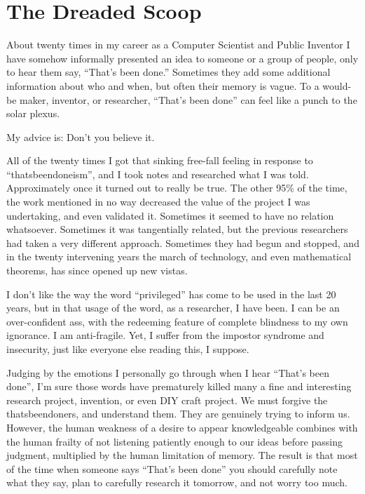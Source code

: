 \documentclass[
	fontsize=10pt, %
	twoside=false, %
	secnumdepth=1, %
]{kaobook}
\begin{document}
\section{The Dreaded Scoop}

About twenty times in my career as a Computer Scientist and Public
Inventor I have somehow informally presented an idea to someone or a
group of people, only to hear them say, “That’s been done.”  Sometimes
they add some additional information about who and when, but often
their memory is vague.  To a would-be maker, inventor, or researcher,
“That’s been done” can feel like a punch to the solar plexus.

My advice is: Don’t you believe it.

All of the twenty times I got that sinking free-fall feeling in
response to “thatsbeendoneism”, and I took notes and researched what I
was told. Approximately once it turned out to really be true.  The
other 95\% of the time, the work mentioned in no way decreased the
value of the project I was undertaking, and even validated
it. Sometimes it seemed to have no relation whatsoever. Sometimes it
was tangentially related, but the previous researchers had taken a
very different approach. Sometimes they had begun and stopped, and in
the twenty intervening years the march of technology, and even
mathematical theorems, has since opened up new vistas.

I don’t like the way the word “privileged” has come to be used in the
last 20 years, but in that usage of the word, as a researcher, I have
been. I can be an over-confident ass, with the redeeming feature of
complete blindness to my own ignorance. I am anti-fragile. Yet, I
suffer from the impostor syndrome and insecurity, just like everyone
else reading this, I suppose.

Judging by the emotions I personally go through when I hear “That’s
been done”, I’m sure those words have prematurely killed many a fine
and interesting research project, invention, or even DIY craft
project.  We must forgive the thatsbeendoners, and understand
them. They are genuinely trying to inform us. However, the human
weakness of a desire to appear knowledgeable combines with the human
frailty of not listening patiently enough to our ideas before passing
judgment, multiplied by the human limitation of memory. The result is
that most of the time when someone says “That’s been done” you should
carefully note what they say, plan to carefully research it tomorrow,
and not worry too much.
\end{document}
